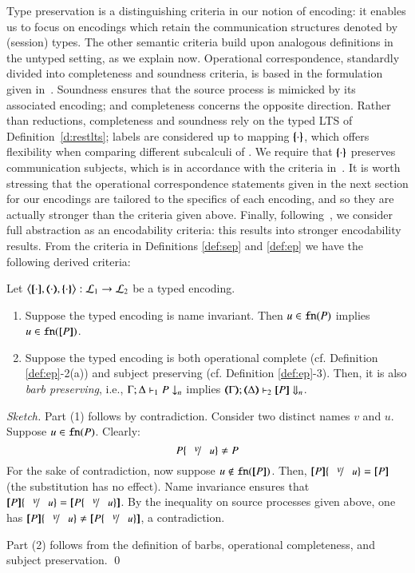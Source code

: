 \noi Type preservation is a distinguishing criteria in our notion of encoding: it enables us to focus on encodings which retain the communication structures denoted by (session) types.
The other semantic
criteria build upon analogous definitions in the untyped setting, as we explain now. 
Operational correspondence, standardly divided into completeness and soundness criteria, is based
in the formulation given in~\cite{DBLP:journals/iandc/Gorla10,DBLP:conf/icalp/LanesePSS10}. 
Soundness ensures that the source process is mimicked 
by its associated encoding; and completeness concerns the opposite direction.
Rather than reductions, completeness and soundness rely on 
the typed LTS of Definition~\ref{d:restlts}; labels are considered up to  mapping $\{\!\!\{\cdot\}\!\!\}$, which offers flexibility when comparing different subcalculi of \HOp. We require that $\{\!\!\{\cdot\}\!\!\}$ preserves communication subjects, which is in accordance with the criteria in~\cite{DBLP:conf/icalp/LanesePSS10}.
It is worth stressing that 
the operational correspondence statements given in
 the next section for our  encodings 
 are tailored to the specifics of each encoding, and so they
 are actually stronger than the criteria given above.
Finally, following~\cite{San923,DBLP:conf/lics/PalamidessiSVV06},
we consider full abstraction as an encodability criteria: this results into 
stronger encodability results. 
From the criteria in Definitions \ref{def:sep} and \ref{def:ep}
we have the following derived criteria: 

\begin{proposition}
Let
	$\enco{\map{\cdot}, \mapt{\cdot}, \mapa{\cdot}}: \tyl{L}_1 \to \tyl{L}_2$
	be a typed encoding.
	\begin{enumerate}[1.]
	\item Suppose the typed encoding is name invariant. Then $u \in \mathtt{fn}(P)$ implies $u \in \mathtt{fn}([\!\![P]\!\!])$.
	\item Suppose the typed encoding is both
 operational complete (cf. Definition \ref{def:ep}-2(a)) 
 and subject preserving (cf. Definition \ref{def:ep}-3).
 Then, it is also \emph{barb preserving}, i.e., 
$\Gamma; \Delta \vdash_1 P \downarrow_{n}$
implies
$\mapt{\Gamma}; \mapt{\Delta} \proves_2 \map{P} \Barb{n}$.
\end{enumerate}
\end{proposition}

\begin{proof}[Sketch]
Part (1) follows by contradiction.
Consider two distinct names $v$ and $u$.
Suppose $u \in \mathtt{fn}(P)$. Clearly:
$$P\subst{v}{u} \neq P$$
For the sake of contradiction, now suppose $u \not\in \mathtt{fn}([\!\![P]\!\!])$.
Then, $\map{P}\subst{v}{u} = \map{P}$ (the substitution has no effect). 
Name invariance  ensures that
$\map{P}\subst{v}{u} = \map{P\subst{v}{u}}$. 
By the inequality
on source processes given above, one has $\map{P}\subst{v}{u} \neq \map{P\subst{v}{u}}$,
a contradiction.

Part (2) follows from the definition of barbs, operational completeness, and subject preservation.
\qed
\end{proof}



